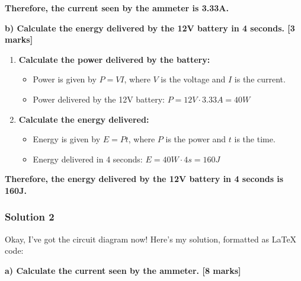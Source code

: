 \documentclass{article}
\begin{document}
\textbf{Therefore, the current seen by the ammeter is 3.33A.}

\textbf{b) Calculate the energy delivered by the 12V battery in 4 seconds. [3 marks]}

\begin{enumerate}
\item \textbf{Calculate the power delivered by the battery:}
    \begin{itemize}
    \item Power is given by $P = VI$, where $V$ is the voltage and $I$ is the current.
    \item  Power delivered by the 12V battery: $P = 12V \cdot 3.33A = 40W$
    \end{itemize}

\item \textbf{Calculate the energy delivered:}
    \begin{itemize}
    \item Energy is given by $E = Pt$, where $P$ is the power and $t$ is the time.
    \item Energy delivered in 4 seconds: $E = 40W \cdot 4s = 160J$
    \end{itemize}
\end{enumerate}

\textbf{Therefore, the energy delivered by the 12V battery in 4 seconds is 160J.} 


\subsubsection{Solution 2}
Okay, I've got the circuit diagram now! Here's my solution, formatted as LaTeX code:

\textbf{a) Calculate the current seen by the ammeter. [8 marks]}
\end{document}
